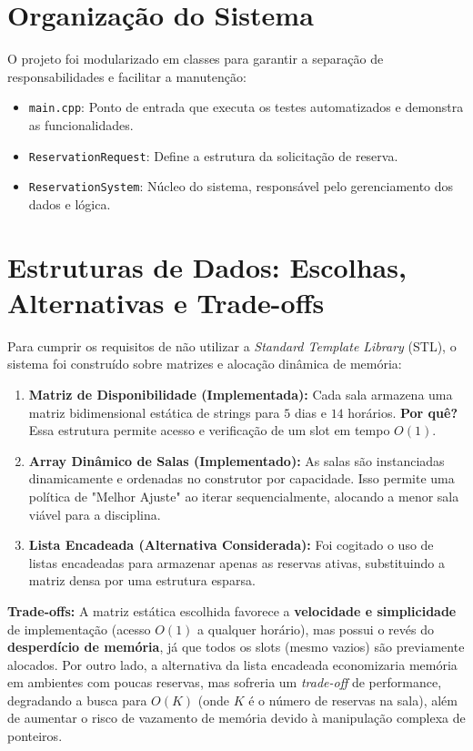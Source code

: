\documentclass[11pt,a4paper]{article}
\begin{document}
\section*{Organização do Sistema}
O projeto foi modularizado em classes para garantir a separação de responsabilidades e facilitar a manutenção:
\begin{itemize}
    \item \texttt{main.cpp}: Ponto de entrada que executa os testes automatizados e demonstra as funcionalidades.
    \item \texttt{ReservationRequest}: Define a estrutura da solicitação de reserva.
    \item \texttt{ReservationSystem}: Núcleo do sistema, responsável pelo gerenciamento dos dados e lógica.
\end{itemize}

\section*{Estruturas de Dados: Escolhas, Alternativas e Trade-offs}
Para cumprir os requisitos de não utilizar a \textit{Standard Template Library} (STL), o sistema foi construído sobre matrizes e alocação dinâmica de memória:

\begin{enumerate}
    \item \textbf{Matriz de Disponibilidade (Implementada):} Cada sala armazena uma matriz bidimensional estática de strings para $5$ dias e $14$ horários. \textbf{Por quê?} Essa estrutura permite acesso e verificação de um slot em tempo $O(1)$. 
    \item \textbf{Array Dinâmico de Salas (Implementado):} As salas são instanciadas dinamicamente e ordenadas no construtor por capacidade. Isso permite uma política de "Melhor Ajuste" ao iterar sequencialmente, alocando a menor sala viável para a disciplina.
    \item \textbf{Lista Encadeada (Alternativa Considerada):} Foi cogitado o uso de listas encadeadas para armazenar apenas as reservas ativas, substituindo a matriz densa por uma estrutura esparsa.
\end{enumerate}

\textbf{Trade-offs:} A matriz estática escolhida favorece a \textbf{velocidade e simplicidade} de implementação (acesso $O(1)$ a qualquer horário), mas possui o revés do \textbf{desperdício de memória}, já que todos os slots (mesmo vazios) são previamente alocados. Por outro lado, a alternativa da lista encadeada economizaria memória em ambientes com poucas reservas, mas sofreria um \textit{trade-off} de performance, degradando a busca para $O(K)$ (onde $K$ é o número de reservas na sala), além de aumentar o risco de vazamento de memória devido à manipulação complexa de ponteiros.
\end{document}
